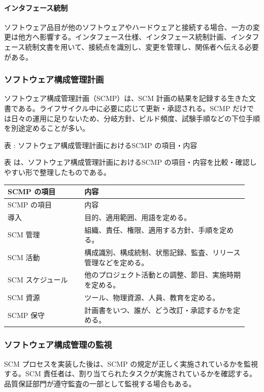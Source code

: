 \paragraph*{インタフェース統制}
ソフトウェア品目が他のソフトウェアやハードウェアと接続する場合、一方の変更は他方へ影響する。インタフェース仕様、インタフェース統制計画、インタフェース統制文書を用いて、接続点を識別し、変更を管理し、関係者へ伝える必要がある。

\subsubsection*{ソフトウェア構成管理計画}
ソフトウェア構成管理計画（SCMP）は、SCM 計画の結果を記録する生きた文書である。ライフサイクル中に必要に応じて更新・承認される。SCMP だけでは日々の運用に足りないため、分岐方針、ビルド頻度、試験手順などの下位手順を別途定めることが多い。

\par\smallskip\noindent{}\label{tab:ch08-02}表 \thetable: ソフトウェア構成管理計画におけるSCMP の項目・内容\par\smallskip
表 \thetable は、ソフトウェア構成管理計画におけるSCMP の項目・内容を比較・確認しやすい形で整理したものである。\par\smallskip
\begin{longtable}{p{0.30\linewidth}p{0.64\linewidth}}\toprule
SCMP の項目 & 内容 \\ \midrule
\endfirsthead\toprule
SCMP の項目 & 内容 \\ \midrule
\endhead
導入 & 目的、適用範囲、用語を定める。 \\
SCM 管理 & 組織、責任、権限、適用する方針、手順を定める。 \\
SCM 活動 & 構成識別、構成統制、状態記録、監査、リリース管理などを定める。 \\
SCM スケジュール & 他のプロジェクト活動との調整、節目、実施時期を定める。 \\
SCM 資源 & ツール、物理資源、人員、教育を定める。 \\
SCMP 保守 & 計画書をいつ、誰が、どう改訂・承認するかを定める。 \\
\bottomrule\end{longtable}
\subsubsection*{ソフトウェア構成管理の監視}
SCM プロセスを実装した後は、SCMP の規定が正しく実施されているかを監視する。SCM 責任者は、割り当てられたタスクが実施されているかを確認する。品質保証部門が遵守監査の一部として監視する場合もある。

